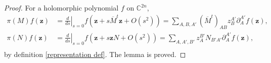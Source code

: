 \documentclass[a4paper,11pt]{amsart}
\numberwithin{equation}{section}
\begin{document}
\begin{proof}
For a holomorphic polynomial $f$ on $\mathbb{C}^{2n}$,
\begin{equation*}\begin{aligned}
\pi(M)f(\mathbf{z})&=\left.\frac{d}{ds}\right|_{s=0}f(\mathbf{z}+s\overline{M}^t\mathbf{z}+O(s^2))=\sum_{A,B,A'}(\overline{M}^t)_{AB}z_B^{A'}\partial_A^{A'}f(\mathbf{z}),\\
\pi(N)f(\mathbf{z})&=\left.\frac{d}{ds}\right|_{s=0}f(\mathbf{z}+s\mathbf{z}N+O(s^2))=\sum_{A,A',B'}z_A^{B'}N_{B'A'}\partial_A^{A'}f(\mathbf{z}),\\
\end{aligned}\end{equation*}
by definition \eqref{representation def}. The lemma is proved.
\end{proof}
\end{document}
